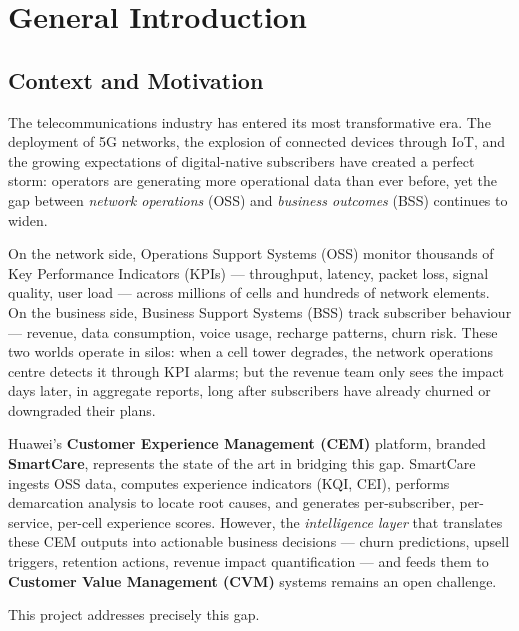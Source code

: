 \chapter{General Introduction}
\label{ch:introduction}

\section{Context and Motivation}

The telecommunications industry has entered its most transformative era. The deployment of 5G networks, the explosion of connected devices through IoT, and the growing expectations of digital-native subscribers have created a perfect storm: operators are generating more operational data than ever before, yet the gap between \emph{network operations} (OSS) and \emph{business outcomes} (BSS) continues to widen.

On the network side, Operations Support Systems (OSS) monitor thousands of Key Performance Indicators (KPIs) --- throughput, latency, packet loss, signal quality, user load --- across millions of cells and hundreds of network elements. On the business side, Business Support Systems (BSS) track subscriber behaviour --- revenue, data consumption, voice usage, recharge patterns, churn risk. These two worlds operate in silos: when a cell tower degrades, the network operations centre detects it through KPI alarms; but the revenue team only sees the impact days later, in aggregate reports, long after subscribers have already churned or downgraded their plans.

Huawei's \textbf{Customer Experience Management (CEM)} platform, branded \textbf{SmartCare}, represents the state of the art in bridging this gap. SmartCare ingests OSS data, computes experience indicators (KQI, CEI), performs demarcation analysis to locate root causes, and generates per-subscriber, per-service, per-cell experience scores. However, the \emph{intelligence layer} that translates these CEM outputs into actionable business decisions --- churn predictions, upsell triggers, retention actions, revenue impact quantification --- and feeds them to \textbf{Customer Value Management (CVM)} systems remains an open challenge.

This project addresses precisely this gap.

